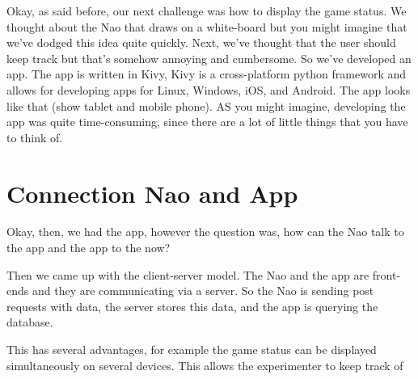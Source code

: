 \documentclass{article}
\begin{document}
Okay, as said before, our next challenge was how to display the game
status. We thought about the Nao that draws on a white-board but you
might imagine that we've dodged this idea quite quickly. Next, we've
thought that the user should keep track but that's somehow annoying
and cumbersome.  So we've developed an app. The app is written in
Kivy, Kivy is a cross-platform python framework and allows for
developing apps for Linux, Windows, iOS, and Android. The app looks
like that (show tablet and mobile phone). AS you might imagine,
developing the app was quite time-consuming, since there are a lot of
little things that you have to think of.


\section{Connection Nao and App}

Okay, then, we had the app, however the question was, how can the Nao
talk to the app and the app to the now?

Then we came up with the client-server model. The Nao and the app are
front-ends and they are communicating via a server. So the Nao is
sending post requests with data, the server stores this data, and the
app is querying the database.

This has several advantages, for example the game status can be
displayed simultaneously on several devices. This allows the
experimenter to keep track of
\end{document}
